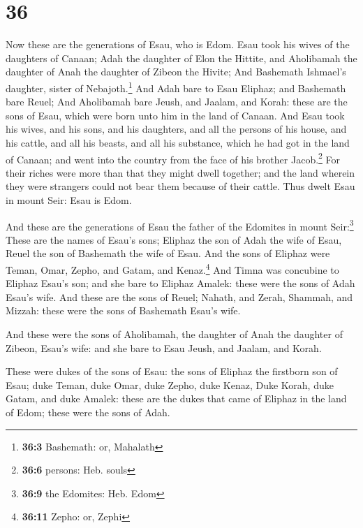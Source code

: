 \hypertarget{section-35}{%
\section{36}\label{section-35}}

 Now these are the generations of Esau, who is Edom.
 Esau took his wives of the daughters of Canaan; Adah the
daughter of Elon the Hittite, and Aholibamah the daughter of Anah the
daughter of Zibeon the Hivite;  And Bashemath Ishmael's
daughter, sister of Nebajoth.\footnote{\textbf{36:3} Bashemath: or,
  Mahalath}  And Adah bare to Esau Eliphaz; and Bashemath
bare Reuel;  And Aholibamah bare Jeush, and Jaalam, and
Korah: these are the sons of Esau, which were born unto him in the land
of Canaan.  And Esau took his wives, and his sons, and his
daughters, and all the persons of his house, and his cattle, and all his
beasts, and all his substance, which he had got in the land of Canaan;
and went into the country from the face of his brother Jacob.\footnote{\textbf{36:6}
  persons: Heb. souls}  For their riches were more than
that they might dwell together; and the land wherein they were strangers
could not bear them because of their cattle.  Thus dwelt
Esau in mount Seir: Esau is Edom.

 And these are the generations of Esau the father of the
Edomites in mount Seir:\footnote{\textbf{36:9} the Edomites: Heb. Edom}
 These are the names of Esau's sons; Eliphaz the son of
Adah the wife of Esau, Reuel the son of Bashemath the wife of Esau.
 And the sons of Eliphaz were Teman, Omar, Zepho, and
Gatam, and Kenaz.\footnote{\textbf{36:11} Zepho: or, Zephi}
 And Timna was concubine to Eliphaz Esau's son; and she
bare to Eliphaz Amalek: these were the sons of Adah Esau's wife.
 And these are the sons of Reuel; Nahath, and Zerah,
Shammah, and Mizzah: these were the sons of Bashemath Esau's wife.

 And these were the sons of Aholibamah, the daughter of
Anah the daughter of Zibeon, Esau's wife: and she bare to Esau Jeush,
and Jaalam, and Korah.

 These were dukes of the sons of Esau: the sons of
Eliphaz the firstborn son of Esau; duke Teman, duke Omar, duke Zepho,
duke Kenaz,  Duke Korah, duke Gatam, and duke Amalek:
these are the dukes that came of Eliphaz in the land of Edom; these were
the sons of Adah.

